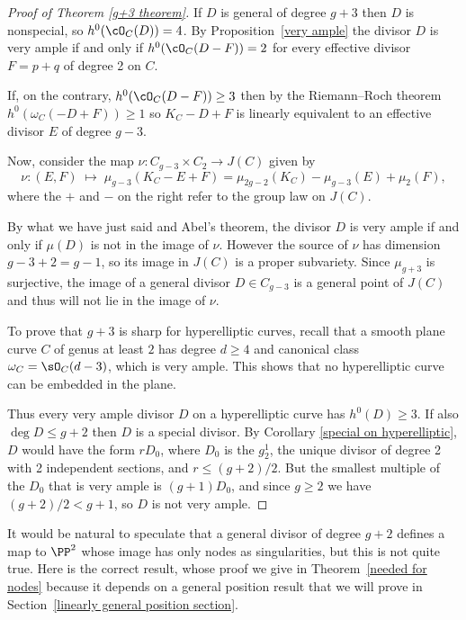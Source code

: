 \begin{proof}[Proof of Theorem \ref{g+3 theorem}]
If 
$D$ is general of degree $g+3$ then $D$ is nonspecial, 
so $h^0(\cO_C(D)) = 4$. By Proposition~\ref{very ample} the divisor
$D$ is very ample if and only if $h^0(\cO_C(D-F)) = 2$
for every effective divisor $F = p+q$ of degree 2 on $C$.

If, on the contrary, $h^0(\cO_C(D-F)) \geq 3$ then by the 
Riemann--Roch theorem 
%
$h^0(\omega_C(-D + F)) \geq 1$
so $K_C - D + F$ is  linearly equivalent to 
an effective divisor $E$ of degree $g-3$.

Now, consider the map 
$\nu : C_{g-3} \times C_{2}  \to  J(C)$
given by
$$
\nu : (E,F) \; \mapsto \; \mu_{g-3}(K_C - E + F) = \mu_{2g-2}(K_C) - \mu_{g-3}(E) + \mu_{2}(F), 
$$
where the $+$ and $-$ on the right refer to the group law on $J(C)$. 

By what we have just said and 
Abel's theorem,
%
the divisor $D$ is very ample if and only if
$\mu(D)$ 
is not in the image of $\nu$.
However the source of $\nu$ has dimension $g-3+2 = g-1$, so its image
in $J(C)$ is a proper subvariety. Since $\mu_{g+3}$ is surjective, the
image of a general divisor $D \in C_{g-3}$ is a general point of
$J(C)$ and thus will not lie in the image of $\nu$.

To prove that $g+3$ is sharp for hyperelliptic curves, recall that a
%
smooth plane curve $C$ of genus 
at least $2$
has degree $d\geq 4$ and canonical class 
$\omega_{C} = \sO_{C}(d-\nobreak 3)$, which is very ample. 
This shows that
no hyperelliptic curve  can
be embedded in the plane.

Thus every very ample divisor $D$ on a hyperelliptic curve  has $h^0(D) \geq 3$. If also $\deg D \leq g+2$
then $D$ is a special divisor. By Corollary \ref{special on hyperelliptic}, $D$ would have the form
$rD_0$, where $D_0$ is the $g^1_2$, the unique divisor of degree 2 with 2 independent sections,
and $r \leq (g+2)/2$. But the smallest multiple of the $D_0$ that is very ample is $(g+1)D_0$, and
since $g\geq 2$ we have $(g+2)/2 < g+1$, so $D$ is not very ample.
\unif
\end{proof}

It would be natural to speculate that a general divisor of degree $g+2$ defines a map to $\PP^2$ whose
image has only nodes as singularities, but this is not quite true. Here is the correct result,
whose proof we give in 
Theorem~\ref{needed for nodes}
because it depends on a general position result that 
we will prove in Section~\ref{linearly general position section}.

